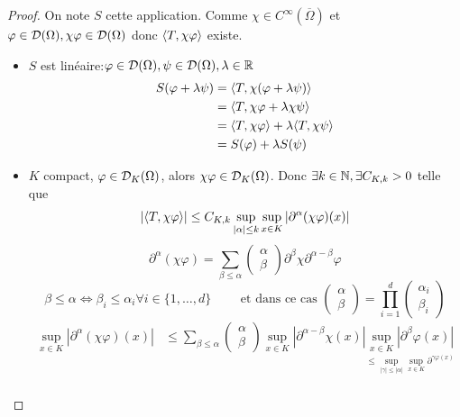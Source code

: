 \documentclass[]{report}
\begin{document}
    \begin{proof}
        On note $S$ cette application. Comme $\chi\in C^\infty(\overline{\Omega})$ et $\varphi \in \mathcal{D}(\Omega),\chi \varphi\in \mathcal{D}(\Omega)$ donc $\langle T,\chi \varphi \rangle$ existe.\\
        \begin{itemize}
            \item $S$ est linéaire:$\varphi\in \mathcal{D}(\Omega),\psi\in \mathcal{D}(\Omega),\lambda \in \mathbb{R}$
            \begin{align*}
                S(\varphi+\lambda \psi)&=\langle T,\chi(\varphi+\lambda \psi) \rangle\\
                &=\langle T,\chi \varphi+\lambda \chi \psi \rangle\\
                &=\langle T,\chi \varphi \rangle+ \lambda \langle T,\chi \psi \rangle\\
                &=S(\varphi)+\lambda S(\psi)
            \end{align*}
            \item $K$ compact, $\varphi\in \mathcal{D}_K(\Omega)$, alors $\chi \varphi \in \mathcal{D}_K(\Omega)$. Donc $\exists k\in \mathbb{N},\exists C_{K,k}>0$ telle que
            \[\left|\langle T,\chi \varphi \rangle\right|\le C_{K,k} \sup_{|\alpha|\le k} \sup_{x\in K}\left|\partial^{\alpha}(\chi \varphi)(x)\right|\]
            \[\partial^{\alpha}(\chi \varphi)=\sum_{\beta\le \alpha}\left(\begin{matrix}
                \alpha\\
                \beta
            \end{matrix}\right)\partial^{\beta}\chi \partial^{\alpha-\beta}\varphi\]
            \[\beta\le \alpha \iff \beta_i\le \alpha_i \forall i\in \{1,\ldots,d\}\qquad \text{ et dans ce cas }\left(\begin{matrix}
                \alpha\\
                \beta
            \end{matrix}\right)=\prod_{i=1}^{d}\left(\begin{matrix}
                \alpha_i\\
                \beta_i
            \end{matrix}\right)\]
            \begin{align*}
                \sup_{x\in K}\left|\partial^{\alpha}(\chi\varphi)(x)\right|&\le \sum_{\beta \le \alpha} \left(\begin{matrix}
                \alpha\\
                \beta
            \end{matrix}\right)\sup_{x\in K}\left|\partial^{\alpha -\beta}\chi (x)\right| \underset{\le \sup_{|\gamma|\le |\alpha|}\sup_{x\in K}\partial^{\gamma \varphi(x)}}{\sup_{x\in K} \left|\partial^{\beta} \varphi(x)\right|}\\

\end{align*}
\end{itemize}
\end{proof}
\end{document}
